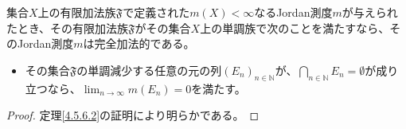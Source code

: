 \documentclass[dvipdfmx]{jsarticle}
\begin{document}
\begin{thm}\label{4.5.6.4}
集合$X$上の有限加法族$\mathfrak{F}$で定義された$m(X) < \infty$なるJordan測度$m$が与えられたとき、その有限加法族$\mathfrak{F}$がその集合$X$上の単調族で次のことを満たすなら、そのJordan測度$m$は完全加法的である。
\begin{itemize}
\item
  その集合$\mathfrak{F}$の単調減少する任意の元の列$\left( E_{n} \right)_{n \in \mathbb{N}}$が、$\bigcap_{n \in \mathbb{N}} E_{n} = \emptyset$が成り立つなら、$\lim_{n \rightarrow \infty}{m\left( E_{n} \right)} = 0$を満たす。
\end{itemize}
\end{thm}
\begin{proof} 定理\ref{4.5.6.2}の証明により明らかである。
\end{proof}
\end{document}
